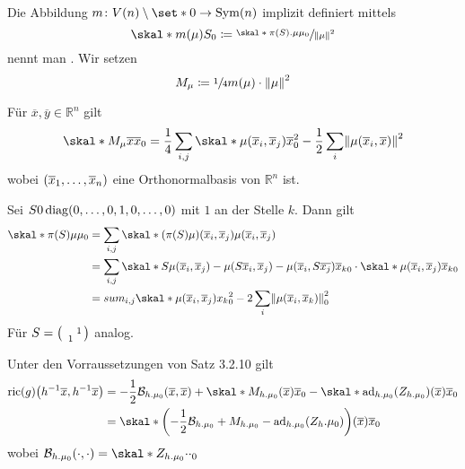 \begin{definition}[{name=[Momentenabbildung]}]
	Die Abbildung $m \colon V(n) \setminus \set*{0} \to \Sym(n)$ implizit definiert mittels
	\[
		\skal*{m(\mu)}{S}_0 \coloneqq \sfrac{\skal*{\pi(S). \mu}{\mu}_0}{\norm*{\mu}^2}
	\]
	nennt man . Wir setzen
	\[
		M_\mu \coloneqq \sfrac{1}{4} m(\mu) \cdot \norm*{\mu}^2
	\]
\end{definition}


\begin{lemma}
	Für $\overline{x}, \overline{y} \in \mathbb{R}^n$ gilt
	\[
		\skal*{M_\mu \overline{x}}{\overline{x}}_0 = \frac{1}{4} \sum_{i,j} \skal*{\mu(\overline{x}_i, \overline{x}_j)}{\overline{x}}_0^2 - \frac{1}{2} \sum_i \norm*{\mu(\overline{x}_i, \overline{x})}^2
	\]
	wobei $\enbrace*{\overline{x}_1, \ldots ,\overline{x}_n}$ eine Orthonormalbasis von $\mathbb{R}^n$ ist.
\end{lemma}
\begin{beweis}
	Sei $S 0 \diag(0, \ldots ,0, 1,0,\ldots ,0)$ mit $1$ an der Stelle $k$.
	Dann gilt
	\begin{align}
		\skal*{\pi(S) \mu}{\mu}_0 &= \sum_{i,j} \skal*{\enbrace*{\pi(S)\mu} \enbrace*{\overline{x}_i, \overline{x}_j}}{\mu \enbrace*{\overline{x}_i, \overline{x}_j}} \\
		&= \sum_{i,j} \skal*{S \mu \enbrace*{\overline{x}_i, \overline{x}_j} - \mu(S \overline{x}_i, \overline{x}_j) - \mu(\overline{x}_i, S \overline{x_j})}{\overline{x}_k}_0 \cdot \skal*{\mu(\overline{x}_i, \overline{x}_j)}{\overline{x}_k}_0 \\
		&= sum_{i,j} \skal*{\mu \enbrace*{\overline{x}_i, \overline{x}_j}}{x_k}_0^2 - 2 \sum_i \norm*{\mu(\overline{x}_i, \overline{x}_k)}_0^2
	\end{align}
	Für $S = \begin{psmallmatrix}
		& & \\
		& & 1 \\
		& 1 &
	\end{psmallmatrix}$ analog.
\end{beweis}

\begin{satz}
	Unter den Vorraussetzungen von Satz 3.2.10 gilt
	\begin{align}
		\ric(g)\enbrace*{h^{-1} \overline{x},h^{-1} \overline{x}} &= -\frac{1}{2} \mathcal{B}_{h.\mu_0} (\overline{x},\overline{x}) + \skal*{M_{h.\mu_0}(\overline{x})}{\overline{x}}_0 - \skal*{\ad_{h.\mu_0}(Z_{h.\mu_0})(\overline{x})}{\overline{x}}_0 \\
		&= \skal*{\enbrace*{- \frac{1}{2} \mathcal{B}_{h.\mu_0} + M_{h.\mu_0} - \ad_{h.\mu_0}(Z_h.\mu_0)}(\overline{x})}{\overline{x}}_0
	\end{align}
	wobei $\mathcal{B}_{h.\mu_0}(\cdot ,\cdot ) = \skal*{Z_{h.\mu_0} \cdot }{\cdot }_0$
\end{satz}

